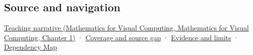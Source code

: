 \subsection{Source and navigation}\label{appendix-87d7626c8d37-source-and-navigation}

\href{../02-Mathematics-for-Visual-Computing/main.pdf\#nameddest=01-foundations-i-ch017-oriented-area-tells-us-which-side-of-the-panel-is-front}{Teaching narrative (Mathematics for Visual Computing, Mathematics for Visual Computing, Chapter 1)} · \hyperref[appendix-fd090d982a15-phase-6---parts-501-600]{Coverage and source gap} · \hyperref[appendix-a103e7846d21-phase-6---source-analysis-and-verification]{Evidence and limits} · \hyperref[appendix-4ad47bdd269a]{Dependency Map}
